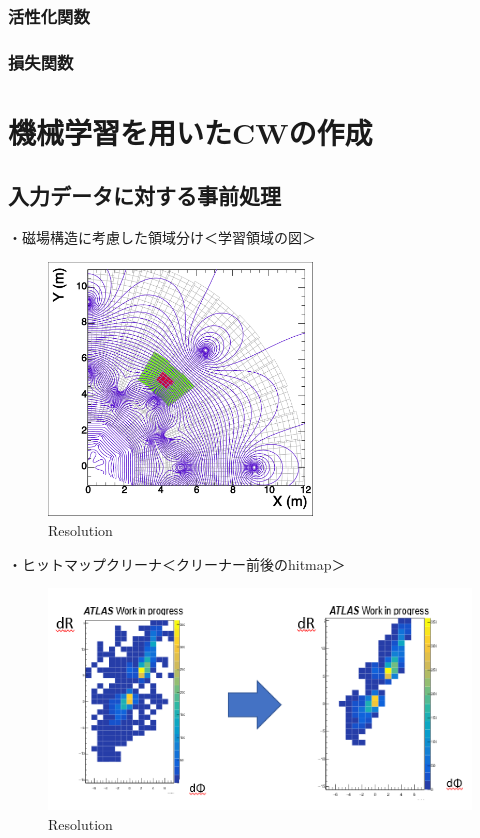 \subsubsection{活性化関数}

\subsubsection{損失関数}

\section{機械学習を用いたCWの作成}
\subsection{入力データに対する事前処理}
・磁場構造に考慮した領域分け＜学習領域の図＞\\
\begin{figure}[tb]
  \centering
  \includegraphics[clip, width=7cm]{fig/4/c1_withMag.pdf}
  \caption{Resolution}
  \label{fig:Resolution}
\end{figure}

・ヒットマップクリーナ＜クリーナー前後のhitmap＞
\begin{figure}[tb]
  \centering
  \includegraphics[clip, width=14cm]{fig/4/cleaner.png}
  \caption{Resolution}
  \label{fig:Resolution}
\end{figure}


